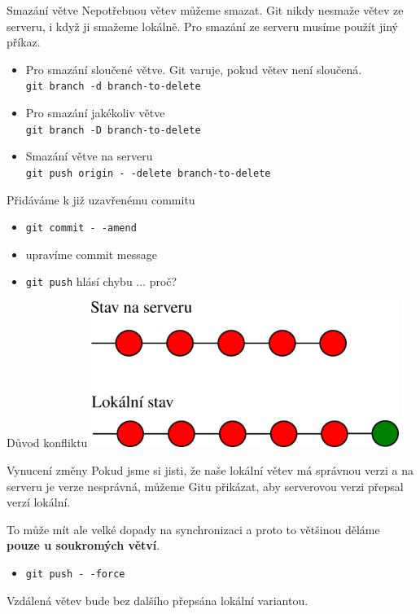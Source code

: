 \documentclass[14pt]{beamer}
\renewcommand{\texttt}[1]{{{\tt\color{blue}#1}}}
\begin{document}
	\begin{frame}{Smazání větve}
		Nepotřebnou větev můžeme smazat. Git nikdy nesmaže větev ze serveru, i když ji smažeme lokálně. Pro smazání ze serveru musíme použít jiný příkaz.
	\begin{itemize}
		\item Pro smazání sloučené větve. Git varuje, pokud větev není sloučená.\\
		\texttt{git branch -d branch-to-delete}
		\item Pro smazání jakékoliv větve \\
		\texttt{git branch -D branch-to-delete}
		\item Smazání větve na serveru \\
		\texttt{git push origin -\,-delete branch-to-delete}
	\end{itemize}
\end{frame}

	\begin{frame}{Přidáváme k již uzavřenému commitu}
	\begin{itemize}
		\item \texttt{git commit -\,-amend}
		\item upravíme commit message
		\item \texttt{git push} hlásí chybu $\ldots$ proč?
	\end{itemize}
	\end{frame}

	\begin{frame}{Důvod konfliktu}
	\includegraphics[width=10cm]{images/amend}
	\end{frame}

	\begin{frame}{Vynucení změny}
		Pokud jsme si jisti, že naše lokální větev má správnou verzi a na serveru je verze nesprávná, můžeme Gitu přikázat, aby serverovou verzi přepsal verzí lokální.
		
		To může mít ale velké dopady na synchronizaci a proto to většinou děláme \textbf{pouze u soukromých větví}.
	\begin{itemize}
		\item \texttt{git push -\,-force}
	\end{itemize}
	Vzdálená větev bude bez dalšího přepsána lokální variantou.
	\end{frame}
\end{document}
